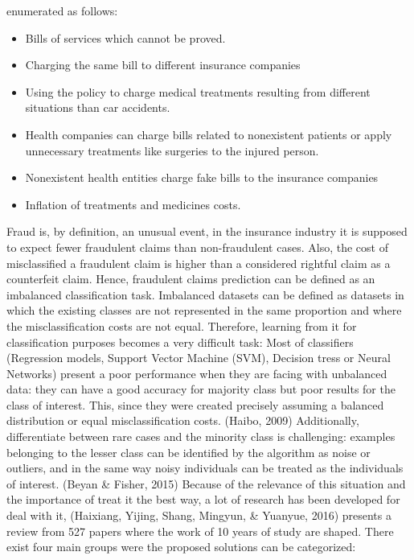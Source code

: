 \documentclass[parskip=full]{scrartcl}
\begin{document}
enumerated as follows: 
\begin{itemize}
	\item Bills of services which cannot be proved.
	\item Charging the same bill to different insurance companies
	\item Using the policy to charge medical treatments resulting from 
	different situations than car accidents.
	\item Health companies can charge bills related to nonexistent patients or 
	apply unnecessary treatments like surgeries to the injured person.
	\item Nonexistent health entities charge fake bills to the insurance 
	companies
	\item Inflation of treatments and medicines costs.
\end{itemize}
Fraud is, by definition, an unusual event, in the insurance industry it is 
supposed to expect fewer fraudulent claims than non-fraudulent cases. Also, the 
cost of misclassified a fraudulent claim is higher than a considered rightful 
claim as a counterfeit claim.  Hence, fraudulent claims prediction can be 
defined as an imbalanced classification task. 
Imbalanced datasets can be defined as datasets in which the existing classes 
are not represented in the same proportion and where the misclassification 
costs are not equal. Therefore, learning from it for classification purposes 
becomes a very difficult task: 
Most of classifiers (Regression models, Support Vector Machine (SVM), Decision 
tress or Neural Networks) present a poor performance when they are facing with 
unbalanced data: they can have a good accuracy for majority class but poor 
results for the class of interest.  This, since they were created precisely 
assuming a balanced distribution or equal misclassification costs. (Haibo, 
2009) 
Additionally, differentiate between rare cases and the minority class is 
challenging: examples belonging to the lesser class can be identified by the 
algorithm as noise or outliers, and in the same way noisy individuals can be 
treated as the individuals of interest. (Beyan & Fisher, 2015)
Because of the relevance of this situation and the importance of treat it the 
best way, a lot of research has been developed for deal with it, (Haixiang, 
Yijing, Shang, Mingyun, & Yuanyue, 2016) presents a review from 527 papers 
where the work of 10 years of study are shaped. 
There exist four main groups were the proposed solutions can be categorized: 





\end{document}
